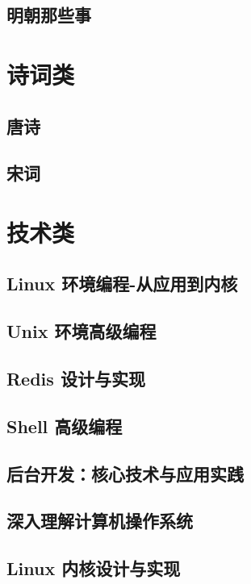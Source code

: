\documentclass[UTF8,a4paper,12pt]{ctexbook}
\begin{document}
	\section{明朝那些事}

\chapter{诗词类}
	\section{唐诗}

	\section{宋词}


\chapter{技术类} 
	\section{Linux 环境编程-从应用到内核}
	
	\section{Unix 环境高级编程}

	\section{Redis 设计与实现}
	
	\section{Shell 高级编程}
	
	\section{后台开发：核心技术与应用实践}
	
	\section{深入理解计算机操作系统}
	
	\section{Linux 内核设计与实现}
	
\end{document}
